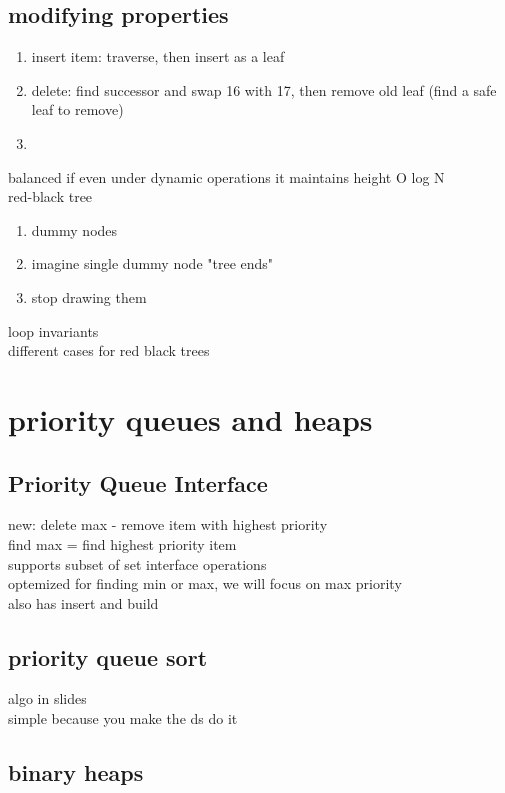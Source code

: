 \documentclass{article}
\begin{document}
\subsection{modifying properties}
\begin{enumerate}
    \item insert item: traverse, then insert as a leaf
    \item delete: find successor and swap 16 with 17, then remove old leaf (find a safe leaf to remove)
    \item 
\end{enumerate}
balanced if even under dynamic operations it maintains height O log N\\
red-black tree\\
\begin{enumerate}
    \item dummy nodes
    \item imagine single dummy node "tree ends"
    \item stop drawing them
\end{enumerate}
loop invariants\\
different cases for red black trees\\
\section{priority queues and heaps}
\subsection{Priority Queue Interface}
new: delete max - remove item with highest priority\\
find max = find highest priority item\\
supports subset of set interface operations\\
optemized for finding min or max, we will focus on max priority\\
also has insert and build
\subsection{priority queue sort}
algo in slides\\
simple because you make the ds do it\\
\subsection{binary heaps}
\end{document}
